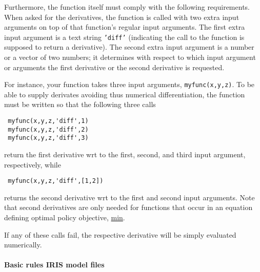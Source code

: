  Furthermore, the function itself must comply with the following
 requirements. When asked for the derivatives, the function is called
 with two extra input arguments on top of that function's regular input
 arguments. The first extra input argument is a text string
 \texttt{'diff'} (indicating the call to the function is supposed to
 return a derivative). The second extra input argument is a number or a
 vector of two numbers; it determines with respect to which input
 argument or arguments the first derivative or the second derivative is
 requested.
 
 For instance, your function takes three input arguments,
 \texttt{myfunc(x,y,z)}. To be able to supply derivates avoiding thus
 numerical differentiation, the function must be written so that the
 following three calls
 
 \begin{verbatim}
 myfunc(x,y,z,'diff',1)
 myfunc(x,y,z,'diff',2)
 myfunc(x,y,z,'diff',3)
 \end{verbatim}
 
 return the first derivative wrt to the first, second, and third input
 argument, respectively, while
 
 \begin{verbatim}
 myfunc(x,y,z,'diff',[1,2])
 \end{verbatim}
 
 returns the second derivative wrt to the first and second input
 arguments. Note that second derivatives are only needed for functions
 that occur in an equation defining optimal policy objective,
 \href{modellang/min}{min}.
 
 If any of these calls fail, the respective derivative will be simply
 evaluated numerically.
 
 \paragraph{Basic rules IRIS model files}
 
